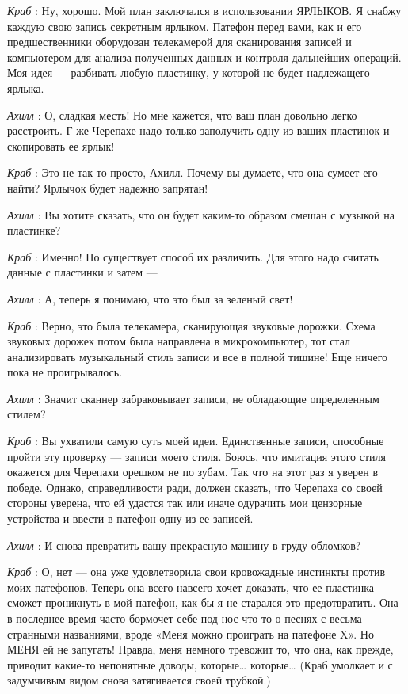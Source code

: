 \emph{Краб} : Ну, хорошо. Мой план заключался в использовании ЯРЛЫКОВ. Я снабжу каждую свою запись секретным ярлыком. Патефон перед вами, как и его предшественники оборудован телекамерой для сканирования записей и компьютером для анализа полученных данных и контроля дальнейших операций. Моя идея --- разбивать любую пластинку, у которой не будет надлежащего ярлыка.

\emph{Ахилл} : О, сладкая месть! Но мне кажется, что ваш план довольно легко расстроить. Г-же Черепахе надо только заполучить одну из ваших пластинок и скопировать ее ярлык!

\emph{Краб} : Это не так-то просто, Ахилл. Почему вы думаете, что она сумеет его найти? Ярлычок будет надежно запрятан!

\emph{Ахилл} : Вы хотите сказать, что он будет каким-то образом смешан с музыкой на пластинке?

\emph{Краб} : Именно! Но существует способ их различить. Для этого надо считать данные с пластинки и затем ---

\emph{Ахилл} : А, теперь я понимаю, что это был за зеленый свет!

\emph{Краб} : Верно, это была телекамера, сканирующая звуковые дорожки. Схема звуковых дорожек потом была направлена в микрокомпьютер, тот стал анализировать музыкальный стиль записи и все в полной тишине! Еще ничего пока не проигрывалось.

\emph{Ахилл} : Значит сканнер забраковывает записи, не обладающие определенным стилем?

\emph{Краб} : Вы ухватили самую суть моей идеи. Единственные записи, способные пройти эту проверку --- записи моего стиля. Боюсь, что имитация этого стиля окажется для Черепахи орешком не по зубам. Так что на этот раз я уверен в победе. Однако, справедливости ради, должен сказать, что Черепаха со своей стороны уверена, что ей удастся так или иначе одурачить мои цензорные устройства и ввести в патефон одну из ее записей.

\emph{Ахилл} : И снова превратить вашу прекрасную машину в груду обломков?

\emph{Краб} : О, нет --- она уже удовлетворила свои кровожадные инстинкты против моих патефонов. Теперь она всего-навсего хочет доказать, что ее пластинка сможет проникнуть в мой патефон, как бы я не старался это предотвратить. Она в последнее время часто бормочет себе под нос что-то о песнях с весьма странными названиями, вроде «Меня можно проиграть на патефоне X». Но МЕНЯ ей не запугать! Правда, меня немного тревожит то, что она, как прежде, приводит какие-то непонятные доводы, которые\ldots{} которые\ldots{} (Краб умолкает и с задумчивым видом снова затягивается своей трубкой.)

